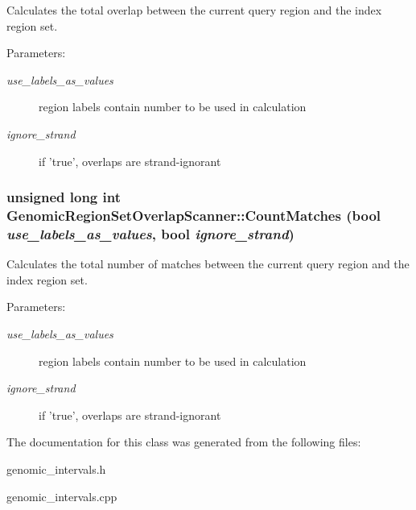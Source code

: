 Calculates the total overlap between the current query region and the index region set. 

\begin{Desc}
\item[Parameters:]
\begin{description}
\item[{\em use\_\-labels\_\-as\_\-values}]region labels contain number to be used in calculation \item[{\em ignore\_\-strand}]if 'true', overlaps are strand-ignorant \end{description}
\end{Desc}
\hypertarget{classGenomicRegionSetOverlapScanner_7826504ecdb81cf0828b428078ec1844}{
\subsubsection[CountMatches]{\setlength{\rightskip}{0pt plus 5cm}unsigned long int GenomicRegionSetOverlapScanner::CountMatches (bool {\em use\_\-labels\_\-as\_\-values}, \/  bool {\em ignore\_\-strand})}}
\label{classGenomicRegionSetOverlapScanner_7826504ecdb81cf0828b428078ec1844}


Calculates the total number of matches between the current query region and the index region set. 

\begin{Desc}
\item[Parameters:]
\begin{description}
\item[{\em use\_\-labels\_\-as\_\-values}]region labels contain number to be used in calculation \item[{\em ignore\_\-strand}]if 'true', overlaps are strand-ignorant \end{description}
\end{Desc}


The documentation for this class was generated from the following files:\begin{CompactItemize}
\item 
genomic\_\-intervals.h\item 
genomic\_\-intervals.cpp\end{CompactItemize}
